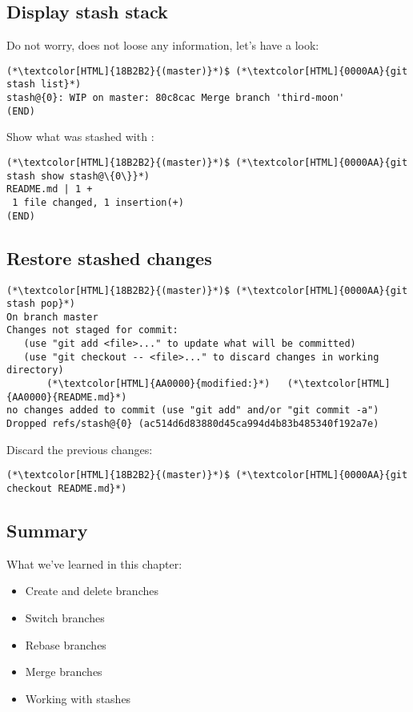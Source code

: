\subsection{Display stash stack}
\begin{frame}[fragile]
  \subslidetitle
  Do not worry,  does not loose any information, let's have a look:

  \begin{lstlisting}
(*\textcolor[HTML]{18B2B2}{(master)}*)$ (*\textcolor[HTML]{0000AA}{git stash list}*)
stash@{0}: WIP on master: 80c8cac Merge branch 'third-moon'
(END)
\end{lstlisting}
  Show what was stashed with :
  \begin{lstlisting}
(*\textcolor[HTML]{18B2B2}{(master)}*)$ (*\textcolor[HTML]{0000AA}{git stash show stash@\{0\}}*)
README.md | 1 +
 1 file changed, 1 insertion(+)
(END)
\end{lstlisting}

\end{frame}

\subsection{Restore stashed changes}
\begin{frame}[fragile]
  \subslidetitle

  \begin{lstlisting}
(*\textcolor[HTML]{18B2B2}{(master)}*)$ (*\textcolor[HTML]{0000AA}{git stash pop}*)
On branch master
Changes not staged for commit:
   (use "git add <file>..." to update what will be committed)
   (use "git checkout -- <file>..." to discard changes in working directory)
       (*\textcolor[HTML]{AA0000}{modified:}*)   (*\textcolor[HTML]{AA0000}{README.md}*)
no changes added to commit (use "git add" and/or "git commit -a")
Dropped refs/stash@{0} (ac514d6d83880d45ca994d4b83b485340f192a7e)
\end{lstlisting}
  Discard the previous changes:
  \begin{lstlisting}
(*\textcolor[HTML]{18B2B2}{(master)}*)$ (*\textcolor[HTML]{0000AA}{git checkout README.md}*)
\end{lstlisting}
\end{frame}

\subsection{Summary}
\begin{frame}[fragile]
\subslidetitle
  What we've learned in this chapter:
  \begin{itemize}
    \item Create and delete branches
    \item Switch branches
    \item Rebase branches
    \item Merge branches
    \item Working with stashes
  \end{itemize}
\end{frame}

